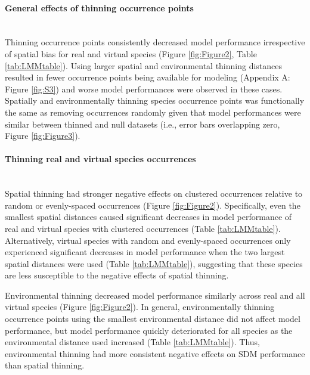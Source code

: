 \paragraph*{General effects of thinning occurrence points}\mbox{}\\ 
Thinning occurrence points consistently decreased model performance irrespective of spatial bias for real and virtual species (Figure \ref{fig:Figure2}, Table \ref{tab:LMMtable}). Using larger spatial and environmental thinning distances resulted in fewer occurrence points being available for modeling (Appendix A: Figure \ref{fig:S3}) and worse model performances were observed in these cases. Spatially and environmentally thinning species occurrence points was functionally the same as removing occurrences randomly given that model performances were similar between thinned and null datasets (i.e., error bars overlapping zero, Figure \ref{fig:Figure3}).




\paragraph*{Thinning real and virtual species occurrences}\mbox{}\\ 
Spatial thinning had stronger negative effects on clustered occurrences relative to random or evenly-spaced occurrences (Figure \ref{fig:Figure2}). Specifically, even the smallest spatial distances caused significant decreases in model performance of real and virtual species with clustered occurrences (Table \ref{tab:LMMtable}). Alternatively, virtual species with random and evenly-spaced occurrences only experienced significant decreases in model performance when the two largest spatial distances were used (Table \ref{tab:LMMtable}), suggesting that these species are less susceptible to the negative effects of spatial thinning. 

Environmental thinning decreased model performance similarly across real and all virtual species (Figure \ref{fig:Figure2}). In general, environmentally thinning occurrence points using the smallest environmental distance did not affect model performance, but model performance quickly deteriorated for all species as the environmental distance used increased (Table \ref{tab:LMMtable}). Thus, environmental thinning had more consistent negative effects on SDM performance than spatial thinning. 








